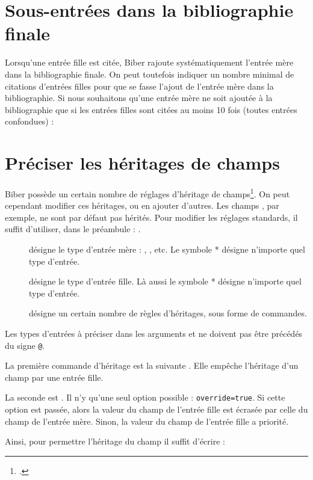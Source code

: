 \section{Sous-entrées dans la bibliographie finale}


Lorsqu'une entrée fille est citée, Biber rajoute systématiquement l'entrée mère dans la bibliographie finale. On peut toutefois indiquer un nombre minimal de citations d'entrées filles pour que se fasse l'ajout de l'entrée mère dans la bibliographie. Si nous souhaitons qu'une entrée mère ne soit ajoutée à la bibliographie que si les entrées filles sont citées au moins 10 fois (toutes entrées confondues) :


\begin{latexcode}
\usepackage[mincrossrefs=10,…]{biblatex}
\end{latexcode}





\section{Préciser les héritages de champs}

Biber possède un certain nombre de réglages d'héritage de champs\footcite{biblatex_crossrefsetup}. On peut cependant modifier ces héritages, ou en ajouter d'autres. Les champs , par exemple, ne sont par défaut pas hérités. 
Pour modifier les réglages standards, il suffit d'utiliser, dans le préambule  :
.

\begin{description}
\item[] désigne le type d'entrée mère : , , etc. Le symbole * désigne n'importe quel type d'entrée.
\item[] désigne le type d'entrée fille. Là aussi le symbole * désigne n'importe quel type d'entrée.
\item[] désigne un certain nombre de règles d'héritages, sous forme de commandes.
\end{description}

Les types d'entrées à préciser dans les arguments  et  ne doivent pas être précédés du signe \verb|@|.

La première commande d'héritage est la suivante .
Elle empêche l'héritage d'un champ par une entrée fille.

La seconde  est 
.
Il n'y qu'une seul option possible : \verb|override=true|. Si cette option est passée, alors la valeur du champ de l'entrée fille est écrasée par celle du champ de l'entrée mère. Sinon, la valeur  du champ de l'entrée fille a priorité.

Ainsi, pour permettre l'héritage du  champ  il suffit d'écrire :

\begin{latexcode}
\end{latexcode}

